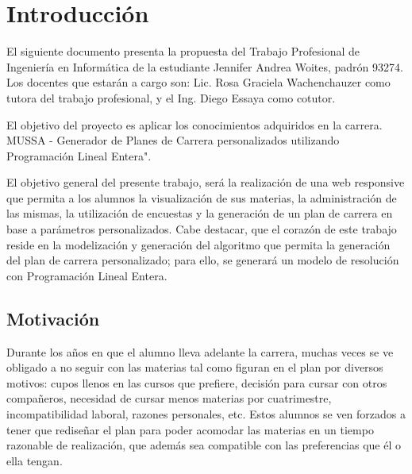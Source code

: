 \documentclass[a4paper]{article}
\begin{document}
  \newpage
  

  \tableofcontents %
    
  \pagestyle{fancy} %
  \rhead{}
  \renewcommand{\headrulewidth}{0.4pt} %

  \newpage


\section{Introducción}

El siguiente documento presenta la propuesta del Trabajo Profesional de Ingeniería en Informática de la estudiante Jennifer Andrea Woites, padrón 93274. Los docentes que estarán a cargo son: Lic. Rosa Graciela Wachenchauzer como tutora del trabajo profesional, y el Ing. Diego Essaya como cotutor. \newline

El objetivo del proyecto es aplicar los conocimientos adquiridos en la carrera. \newline
MUSSA - Generador de Planes de Carrera personalizados utilizando Programación Lineal Entera". \newline

El objetivo general del presente trabajo, será la realización de una web responsive que permita a los alumnos la visualización de sus materias, la administración de las mismas, la utilización de encuestas y la generación de un plan de carrera en base a parámetros personalizados. Cabe destacar, que el corazón de este trabajo reside en la modelización y generación del algoritmo que permita la generación del plan de carrera personalizado; para ello, se generará un modelo de resolución con Programación Lineal Entera.

\subsection{Motivación}

Durante los años en que el alumno lleva adelante la carrera, muchas veces se ve obligado a no seguir con las materias tal como figuran en el plan por diversos motivos: cupos llenos en las cursos que prefiere, decisión para cursar con otros compañeros, necesidad de cursar menos materias por cuatrimestre, incompatibilidad laboral, razones personales, etc. Estos alumnos se ven forzados a tener que rediseñar el plan para poder acomodar las materias en un tiempo razonable de realización, que además sea compatible con las preferencias que él o ella tengan.
\end{document}
